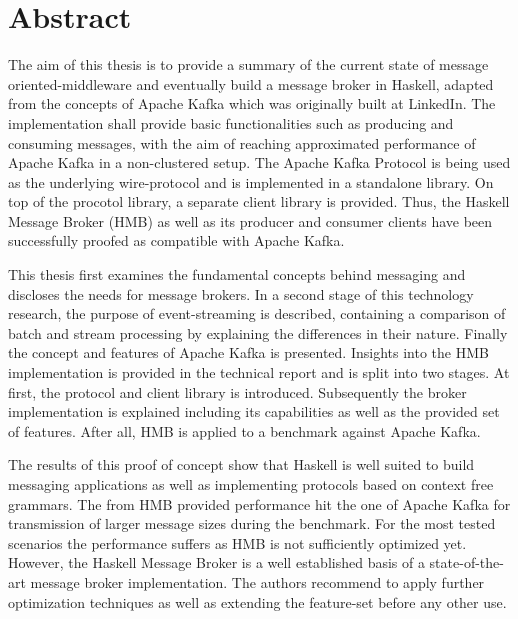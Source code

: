 \chapter{Abstract}

The aim of this thesis is to provide a summary of the current state of message
oriented-middleware and eventually build a message broker in Haskell, adapted
from the concepts of Apache Kafka which was originally built at LinkedIn. The
implementation shall provide basic functionalities such as producing and
consuming messages, with the aim of reaching approximated performance of Apache Kafka
in a non-clustered setup. The Apache Kafka Protocol is being used as the
underlying wire-protocol and is implemented in a standalone library. On top of
the procotol library, a separate client library is provided. Thus, the Haskell
Message Broker (HMB) as well as its producer and consumer clients have been
successfully proofed as compatible with Apache Kafka.

This thesis first examines the fundamental concepts behind messaging and
discloses the needs for message brokers.  In a second stage of this
technology research, the purpose of event-streaming is described, containing a
comparison of batch and stream processing by explaining the
differences in their nature. Finally the concept and features of Apache
Kafka is presented.  Insights into the HMB implementation is provided in the
technical report and is split into two stages.  At first, the protocol
and client library is introduced. Subsequently the broker implementation
is explained including its capabilities as well as the provided
set of features. After all, HMB is applied to a benchmark against
Apache Kafka.

The results of this proof of concept show that Haskell is well suited to build
messaging applications as well as implementing protocols based on context free
grammars. The from HMB provided performance hit the one of Apache Kafka for
transmission of larger message sizes during the benchmark. For the most tested
scenarios the performance suffers as HMB is not sufficiently optimized yet.
However, the Haskell Message Broker is a well established basis of a
state-of-the-art message broker implementation. The authors recommend to apply
further optimization techniques as well as extending the feature-set before any
other use.
